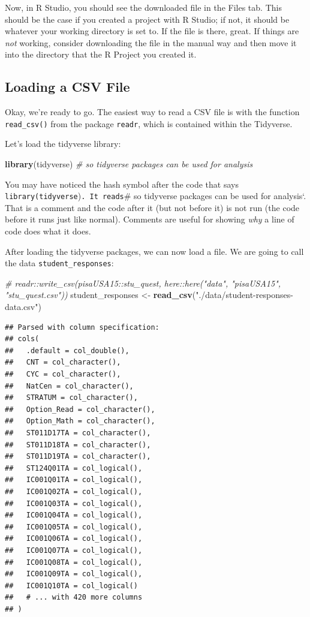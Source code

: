 \documentclass[]{book}
\newenvironment{Shaded}{\begin{snugshade}}{\end{snugshade}}
\newcommand{\KeywordTok}[1]{\textcolor[rgb]{0.13,0.29,0.53}{\textbf{#1}}}
\newcommand{\StringTok}[1]{\textcolor[rgb]{0.31,0.60,0.02}{#1}}
\newcommand{\CommentTok}[1]{\textcolor[rgb]{0.56,0.35,0.01}{\textit{#1}}}
\newcommand{\NormalTok}[1]{#1}
\begin{document}
Now, in R Studio, you should see the downloaded file in the Files tab.
This should be the case if you created a project with R Studio; if not,
it should be whatever your working directory is set to. If the file is
there, great. If things are \emph{not} working, consider downloading the
file in the manual way and then move it into the directory that the R
Project you created it.

\subsection{Loading a CSV File}\label{loading-a-csv-file}

Okay, we're ready to go. The easiest way to read a CSV file is with the
function \texttt{read\_csv()} from the package \texttt{readr}, which is
contained within the Tidyverse.

Let's load the tidyverse library:

\begin{Shaded}
\begin{Highlighting}[]
\KeywordTok{library}\NormalTok{(tidyverse) }\CommentTok{# so tidyverse packages can be used for analysis}
\end{Highlighting}
\end{Shaded}

You may have noticed the hash symbol after the code that says
\texttt{library(tidyverse})\texttt{.\ It\ reads}\# so tidyverse packages
can be used for analysis`. That is a comment and the code after it (but
not before it) is not run (the code before it runs just like normal).
Comments are useful for showing \emph{why} a line of code does what it
does.

After loading the tidyverse packages, we can now load a file. We are
going to call the data \texttt{student\_responses}:

\begin{Shaded}
\begin{Highlighting}[]
\CommentTok{# readr::write_csv(pisaUSA15::stu_quest, here::here("data", "pisaUSA15", "stu_quest.csv"))}
\NormalTok{student_responses <-}
\StringTok{    }\KeywordTok{read_csv}\NormalTok{(}\StringTok{"./data/student-responses-data.csv"}\NormalTok{)}
\end{Highlighting}
\end{Shaded}

\begin{verbatim}
## Parsed with column specification:
## cols(
##   .default = col_double(),
##   CNT = col_character(),
##   CYC = col_character(),
##   NatCen = col_character(),
##   STRATUM = col_character(),
##   Option_Read = col_character(),
##   Option_Math = col_character(),
##   ST011D17TA = col_character(),
##   ST011D18TA = col_character(),
##   ST011D19TA = col_character(),
##   ST124Q01TA = col_logical(),
##   IC001Q01TA = col_logical(),
##   IC001Q02TA = col_logical(),
##   IC001Q03TA = col_logical(),
##   IC001Q04TA = col_logical(),
##   IC001Q05TA = col_logical(),
##   IC001Q06TA = col_logical(),
##   IC001Q07TA = col_logical(),
##   IC001Q08TA = col_logical(),
##   IC001Q09TA = col_logical(),
##   IC001Q10TA = col_logical()
##   # ... with 420 more columns
## )
\end{verbatim}
\end{document}
